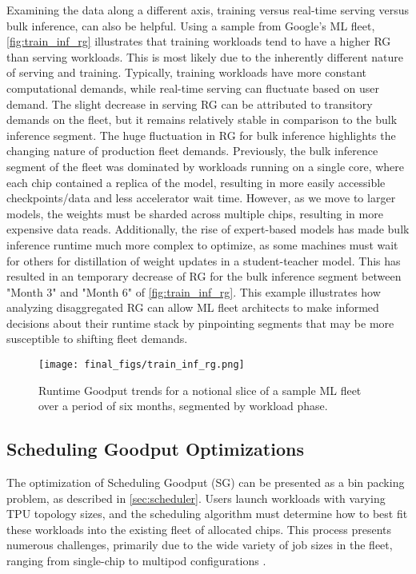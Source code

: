 Examining the data along a different axis, training versus real-time serving versus bulk inference, can also be helpful. Using a sample from Google's ML fleet, \autoref{fig:train_inf_rg} illustrates that training workloads tend to have a higher RG than serving workloads. This is most likely due to the inherently different nature of serving and training.  Typically, training workloads have more constant computational demands, while real-time serving can fluctuate based on user demand. The slight decrease in serving RG can be attributed to transitory demands on the fleet, but it remains relatively stable in comparison to the bulk inference segment. The huge fluctuation in RG for bulk inference highlights the changing nature of production fleet demands. Previously, the bulk inference segment of the fleet was dominated by workloads running on a single core, where each chip contained a replica of the model, resulting in more easily accessible checkpoints/data and less accelerator wait time. However, as we move to larger models, the weights must be sharded across multiple chips, resulting in more expensive data reads. Additionally, the rise of expert-based models \cite{shazeer2017moe} has made bulk inference runtime much more complex to optimize, as some machines must wait for others for distillation of weight updates in a student-teacher model. This has resulted in an temporary decrease of RG for the bulk inference segment between "Month 3" and "Month 6" of \autoref{fig:train_inf_rg}. This example illustrates how analyzing disaggregated RG can allow ML fleet architects to make informed decisions about their runtime stack by pinpointing segments that may be more susceptible to shifting fleet demands.

\begin{figure}[t]
    \centering
    \texttt{[image: final\_figs/train\_inf\_rg.png]}
    \caption{Runtime Goodput trends for a notional slice of a sample ML fleet over a period of six months, segmented by workload phase.}
    \label{fig:train_inf_rg}
\end{figure}



\subsection{Scheduling Goodput Optimizations}

The optimization of Scheduling Goodput (SG) can be presented as a bin packing problem, as described in \autoref{sec:scheduler}. Users launch workloads with varying TPU topology sizes, and the scheduling algorithm must determine how to best fit these workloads into the existing fleet of allocated chips. This process presents numerous challenges, primarily due to the wide variety of job sizes in the fleet, ranging from single-chip to multipod configurations \cite{kumar2021exploring}.

